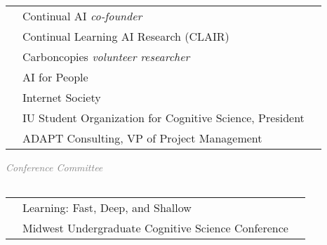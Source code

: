 \documentclass[11pt]{cooperCV_v1/cooperCV} %
\begin{document}
\begin{minipage}{\textwidth}
\begin{tabular}{ p{} %
                        p{} 
                        p{}}
      \end{tabular}
    
       \textcolor{gray}{{\emph{}}} 
       \begin{tabular}{ p{} %
                        p{} 
                        p{}} %
       
      \small &  Continual AI \emph{co-founder} & {\hfill}\\ 
       
      \small &  Continual Learning AI Research (CLAIR) & {\hfill}\\ 
       
      \small &  Carboncopies \emph{volunteer researcher} & {\hfill}\\ 
       
      \small &  AI for People & {\hfill}\\ 
       
      \small &  Internet Society & {\hfill}\\ 
       
      \small &  IU Student Organization for Cognitive Science, President & {\hfill}\\ 
       
      \small &  ADAPT Consulting, VP of Project Management & {\hfill}\\ 
      
      \end{tabular}
    
  

  
    
       \textcolor{gray}{{\emph{Conference \newline Committee}}} 
       \begin{tabular}{ p{} %
                        p{} 
                        p{}} %
      
      \end{tabular}
    
       \textcolor{gray}{{\emph{}}} 
       \begin{tabular}{ p{} %
                        p{} 
                        p{}} %
       
      \small &  Learning: Fast, Deep, and Shallow & {\hfill}\\ 
       
      \small &  Midwest Undergraduate Cognitive Science Conference & {\hfill}\\ 
      

\end{tabular}
\end{minipage}
\end{document}
